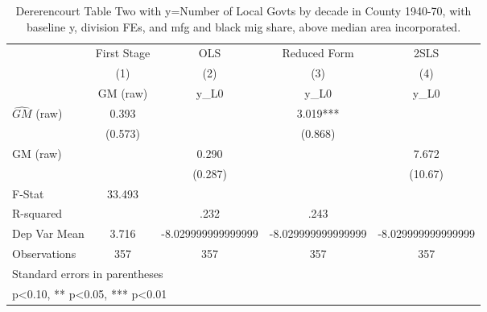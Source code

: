 \begin{table}[htbp]\centering
\def\sym#1{\ifmmode^{#1}\else\(^{#1}\)\fi}
\caption{Dererencourt Table Two with y=Number of Local Govts by decade in County 1940-70, with baseline y, division FEs, and mfg and black mig share, above median area incorporated.}
\begin{tabular}{l*{4}{c}}
\toprule
                    & First Stage   &         OLS   &Reduced Form   &        2SLS   \\
                    &\multicolumn{1}{c}{(1)}&\multicolumn{1}{c}{(2)}&\multicolumn{1}{c}{(3)}&\multicolumn{1}{c}{(4)}\\
                    &\multicolumn{1}{c}{GM  (raw)}&\multicolumn{1}{c}{y\_L0}&\multicolumn{1}{c}{y\_L0}&\multicolumn{1}{c}{y\_L0}\\
\midrule
$\hat{GM}$ (raw)    &       0.393   &               &       3.019***&               \\
                    &     (0.573)   &               &     (0.868)   &               \\
\addlinespace
GM  (raw)           &               &       0.290   &               &       7.672   \\
                    &               &     (0.287)   &               &     (10.67)   \\
\midrule
F-Stat              &      33.493   &               &               &               \\
R-squared           &               &        .232   &        .243   &               \\
Dep Var Mean        &       3.716   &-8.029999999999999   &-8.029999999999999   &-8.029999999999999   \\
Observations        &         357   &         357   &         357   &         357   \\
\bottomrule
\multicolumn{5}{l}{\footnotesize Standard errors in parentheses}\\
\multicolumn{5}{l}{\footnotesize * p<0.10, ** p<0.05, *** p<0.01}\\
\end{tabular}
\end{table}
